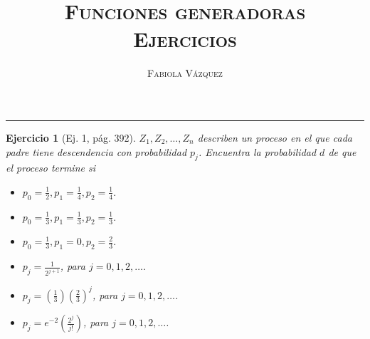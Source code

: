 \documentclass[12pt,letterpaper]{article}
\title{\textsc{Funciones generadoras \\ Ejercicios}}
\author{\textsc{Fabiola Vázquez}}
\newtheorem{ej}{Ejercicio}
\begin{document}
\maketitle
\hrule 
\begin{ej}[Ej. 1, pág. 392]
$Z_1, Z_2, \ldots, Z_n$ describen un proceso en el que cada padre tiene descendencia con probabilidad $p_j$. Encuentra la probabilidad $d$ de que el proceso termine si
\begin{itemize}
\item[(a)] $p_0 = \frac{1}{2}, p_1 = \frac{1}{4}, p_2 = \frac{1}{4}.$
\item[(b)] $p_0 = \frac{1}{3}, p_1 = \frac{1}{3}, p_2 = \frac{1}{3}.$
\item[(c)] $p_0 = \frac{1}{3}, p_1 = 0, p_2 = \frac{2}{3}.$
\item[(d)] $p_j = \frac{1}{2^{j+1}}$, para $j = 0, 1, 2, \ldots$.
\item[(e)] $p_j = \left(\frac{1}{3}\right)\left(\frac{2}{3}\right)^j$, para $j = 0, 1, 2, \ldots$.
\item[(f)] $p_j = e^{-2}\left(\frac{2^j}{j!}\right)$, para $j = 0, 1, 2, \ldots$.
\end{itemize}
\end{ej}
\end{document}
